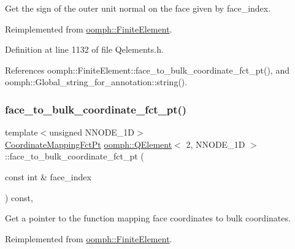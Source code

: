 Get the sign of the outer unit normal on the face given by face\+\_\+index. 



Reimplemented from \hyperlink{classoomph_1_1FiniteElement_a09ec977bcf493ec78b6979a38d83bb2c}{oomph\+::\+Finite\+Element}.



Definition at line 1132 of file Qelements.\+h.



References oomph\+::\+Finite\+Element\+::face\+\_\+to\+\_\+bulk\+\_\+coordinate\+\_\+fct\+\_\+pt(), and oomph\+::\+Global\+\_\+string\+\_\+for\+\_\+annotation\+::string().

\mbox{\label{classoomph_1_1QElement_3_012_00_01NNODE__1D_01_4_a0706636922aff0e25a26f75011ed78b3}} 
\subsubsection{\texorpdfstring{face\+\_\+to\+\_\+bulk\+\_\+coordinate\+\_\+fct\+\_\+pt()}{face\_to\_bulk\_coordinate\_fct\_pt()}}
{\footnotesize\ttfamily template$<$unsigned N\+N\+O\+D\+E\+\_\+1D$>$ \\
\hyperlink{namespaceoomph_afa5c7a93cae1917e874b392601be0bde}{Coordinate\+Mapping\+Fct\+Pt} \hyperlink{classoomph_1_1QElement}{oomph\+::\+Q\+Element}$<$ 2, N\+N\+O\+D\+E\+\_\+1D $>$\+::face\+\_\+to\+\_\+bulk\+\_\+coordinate\+\_\+fct\+\_\+pt (\begin{DoxyParamCaption}\item[{const int \&}]{face\+\_\+index }\end{DoxyParamCaption}) const\hspace{0.3cm}{\ttfamily [inline]}, {\ttfamily [virtual]}}



Get a pointer to the function mapping face coordinates to bulk coordinates. 



Reimplemented from \hyperlink{classoomph_1_1FiniteElement_af20f05fb162a90b7d8ae175ec5dfab1a}{oomph\+::\+Finite\+Element}.



